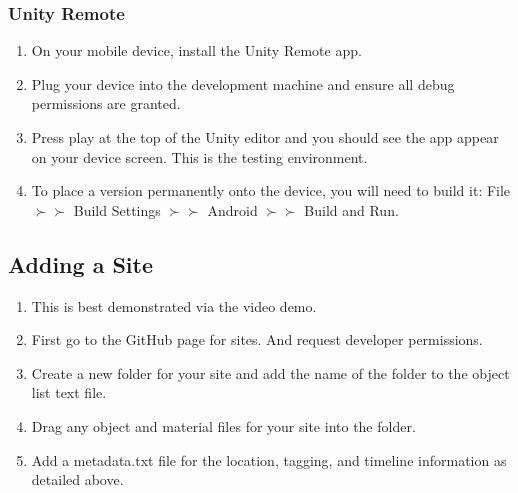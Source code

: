 \documentclass[12pt, a4paper]{article}
\begin{document}
\subsubsection{Unity Remote}
\begin{enumerate}
    \item On your mobile device, install the Unity Remote app.
    \item Plug your device into the development machine and ensure all debug permissions are granted.
    \item Press play at the top of the Unity editor and you should see the app appear on your device screen. This is the testing environment.
    \item To place a version permanently onto the device, you will need to build it: File $\succ\succ$ Build Settings $\succ\succ$ Android $\succ\succ$ Build and Run.
\end{enumerate}

\subsection{Adding a Site}
\begin{enumerate}
    \item This is best demonstrated via the video demo.
    \item First go to the GitHub page for sites. And request developer permissions.
    \item Create a new folder for your site and add the name of the folder to the object list text file.
    \item Drag any object and material files for your site into the folder.
    \item Add a metadata.txt file for the location, tagging, and timeline information as detailed above.
\end{enumerate}
\end{document}
